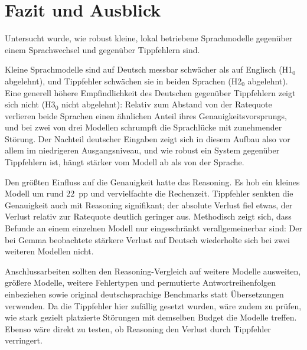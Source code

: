 \documentclass[a4paper,titlepage]{article}
\numberwithin{equation}{section} %
\begin{document}
\newpage

\section{Fazit und Ausblick}\label{sec:fazit}

Untersucht wurde, wie robust kleine, lokal betriebene Sprachmodelle gegenüber einem Sprachwechsel und gegenüber Tippfehlern sind.

Kleine Sprachmodelle sind auf Deutsch messbar schwächer als auf Englisch (H1$_0$ abgelehnt), und Tippfehler schwächen sie in beiden Sprachen (H2$_0$ abgelehnt). Eine generell höhere Empfindlichkeit des Deutschen gegenüber Tippfehlern zeigt sich nicht (H3$_0$ nicht abgelehnt): Relativ zum Abstand von der Ratequote verlieren beide Sprachen einen ähnlichen Anteil ihres Genauigkeitsvorsprungs, und bei zwei von drei Modellen schrumpft die Sprachlücke mit zunehmender Störung. Der Nachteil deutscher Eingaben zeigt sich in diesem Aufbau also vor allem im niedrigeren Ausgangsniveau, und wie robust ein System gegenüber Tippfehlern ist, hängt stärker vom Modell ab als von der Sprache.

Den größten Einfluss auf die Genauigkeit hatte das Reasoning. Es hob ein kleines Modell um rund 22~pp und vervielfachte die Rechenzeit. Tippfehler senkten die Genauigkeit auch mit Reasoning signifikant; der absolute Verlust fiel etwas, der Verlust relativ zur Ratequote deutlich geringer aus. Methodisch zeigt sich, dass Befunde an einem einzelnen Modell nur eingeschränkt verallgemeinerbar sind: Der bei Gemma beobachtete stärkere Verlust auf Deutsch wiederholte sich bei zwei weiteren Modellen nicht.

Anschlussarbeiten sollten den Reasoning-Vergleich auf weitere Modelle ausweiten, größere Modelle, weitere Fehlertypen und permutierte Antwortreihenfolgen einbeziehen sowie original deutschsprachige Benchmarks statt Übersetzungen verwenden. Da die Tippfehler hier zufällig gesetzt wurden, wäre zudem zu prüfen, wie stark gezielt platzierte Störungen mit demselben Budget die Modelle treffen. Ebenso wäre direkt zu testen, ob Reasoning den Verlust durch Tippfehler verringert.
\end{document}
